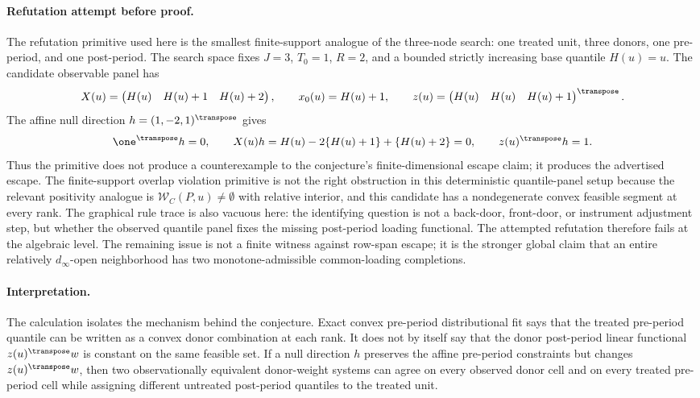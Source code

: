 \paragraph{Refutation attempt before proof.}
The refutation primitive used here is the smallest finite-support analogue of the three-node search: one treated unit, three donors, one pre-period, and one post-period.  The search space fixes \(J=3\), \(T_0=1\), \(R=2\), and a bounded strictly increasing base quantile \(H(u)=u\).  The candidate observable panel has
\[
X(u)=\begin{pmatrix}H(u)&H(u)+1&H(u)+2\end{pmatrix},\qquad
x_0(u)=H(u)+1,\qquad
z(u)=\begin{pmatrix}H(u)&H(u)&H(u)+1\end{pmatrix}^\transpose .
\]
The affine null direction \(h=(1,-2,1)^\transpose\) gives
\[
\one^\transpose h=0,\qquad X(u)h=H(u)-2\{H(u)+1\}+\{H(u)+2\}=0,\qquad z(u)^\transpose h=1.
\]
Thus the primitive does not produce a counterexample to the conjecture's finite-dimensional escape claim; it produces the advertised escape.  The finite-support overlap violation primitive is not the right obstruction in this deterministic quantile-panel setup because the relevant positivity analogue is \(\mathcal{W}_C(P,u)\ne\emptyset\) with relative interior, and this candidate has a nondegenerate convex feasible segment at every rank.  The graphical rule trace is also vacuous here: the identifying question is not a back-door, front-door, or instrument adjustment step, but whether the observed quantile panel fixes the missing post-period loading functional.  The attempted refutation therefore fails at the algebraic level.  The remaining issue is not a finite witness against row-span escape; it is the stronger global claim that an entire relatively \(d_\infty\)-open neighborhood has two monotone-admissible common-loading completions.

\paragraph{Interpretation.}
The calculation isolates the mechanism behind the conjecture.  Exact convex pre-period distributional fit says that the treated pre-period quantile can be written as a convex donor combination at each rank.  It does not by itself say that the donor post-period linear functional \(z(u)^\transpose w\) is constant on the same feasible set.  If a null direction \(h\) preserves the affine pre-period constraints but changes \(z(u)^\transpose w\), then two observationally equivalent donor-weight systems can agree on every observed donor cell and on every treated pre-period cell while assigning different untreated post-period quantiles to the treated unit.

